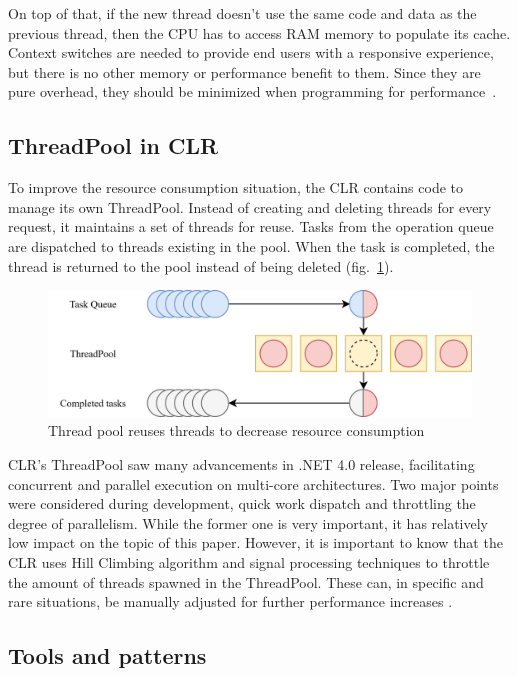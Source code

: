 On top of that, if the new thread doesn't use the same code and data as the previous thread, then the CPU has to access RAM memory to populate its cache.\\

Context switches are needed to provide end users with a responsive experience, but there is no other memory or performance benefit to them. Since they are pure overhead, they should be minimized when programming for performance~\cite{Richter2012Overhead}.

\subsection{ThreadPool in CLR} 
To improve the resource consumption situation, the CLR contains code to manage its own ThreadPool. Instead of creating and deleting threads for every request, it maintains a set of threads for reuse. Tasks from the operation queue are dispatched to threads existing in the pool. When the task is completed, the thread is returned to the pool instead of being deleted (fig.~\ref{fig:threadpool}).

\begin{figure}[htb]
	\centering
		\includegraphics[scale=1.0]{figures02/threadpool.png}
		\caption{Thread pool reuses threads to decrease resource consumption}
		\label{fig:threadpool}
\end{figure}


CLR's ThreadPool saw many advancements in .NET 4.0 release, facilitating concurrent and parallel execution on multi-core architectures. Two major points were considered during development, quick work dispatch and throttling the degree of parallelism. While the former one is very important, it has relatively low impact on the topic of this paper. 
However, it is important to know that the CLR uses Hill Climbing algorithm and signal processing techniques to throttle the amount of threads spawned in the ThreadPool. These can, in specific and rare situations, be manually adjusted for further performance increases \cite{Fuentes2010}.


\subsection{Tools and patterns}
